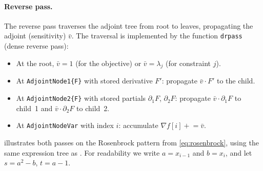 \documentclass[11pt]{article}
\begin{document}
\paragraph{Reverse pass.}
The reverse pass traverses the adjoint tree from root to leaves, propagating the adjoint (sensitivity) $\bar{v}$. The traversal is implemented by the function \texttt{drpass} (dense reverse pass):
\begin{itemize}
  \item At the root, $\bar{v} = 1$ (for the objective) or $\bar{v} = \lambda_j$ (for constraint $j$).
  \item At \texttt{AdjointNode1\{F\}} with stored derivative $F'$: propagate $\bar{v} \cdot F'$ to the child.
  \item At \texttt{AdjointNode2\{F\}} with stored partials $\partial_1 F$, $\partial_2 F$: propagate $\bar{v} \cdot \partial_1 F$ to child~1 and $\bar{v} \cdot \partial_2 F$ to child~2.
  \item At \texttt{AdjointNodeVar} with index $i$: accumulate $\nabla f[i] \mathrel{+}= \bar{v}$.
\end{itemize}

 illustrates both passes on the Rosenbrock pattern from \cref{eq:rosenbrock}, using the same expression tree as . For readability we write $a = x_{i-1}$ and $b = x_i$, and let $s = a^2 - b$, $t = a - 1$.
\end{document}
